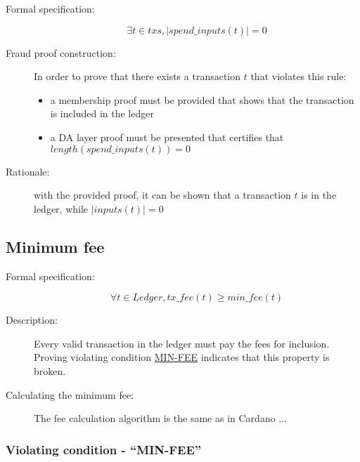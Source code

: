 \documentclass[../midgard.tex]{subfiles}
\begin{document}
\begin{description}

\item[Formal specification:]
\begin{equation*}
    \exists t \in txs, |spend\_inputs(t)| = 0
\end{equation*}

\item[Fraud proof construction:] In order to prove that there exists a transaction $t$ that violates this rule:
\begin{itemize}
    \item a membership proof must be provided that shows that the transaction is included in the ledger
    \item a DA layer proof must be presented that certifies that $length(spend\_inputs(t)) = 0$ \todo
\end{itemize}

\item[Rationale:] with the provided proof, it can be shown that a transaction $t$ is in the ledger, while $|inputs(t)| = 0$

\end{description}

\subsection{Minimum fee}

\begin{description}

\item[Formal specification:]
\begin{equation*}
    \forall t \in Ledger, tx\_fee(t) \geq min\_fee(t)
\end{equation*}

\item[Description:] Every valid transaction in the ledger must pay the fees for inclusion.
  Proving violating condition \hyperref[sec:MIN-FEE]{MIN-FEE} indicates that this property is broken.

\item[Calculating the minimum fee:] The fee calculation algorithm is the same as in Cardano ... \todo

\end{description}

\subsubsection{Violating condition - ``MIN-FEE''}
\label{sec:MIN-FEE}
\end{document}
